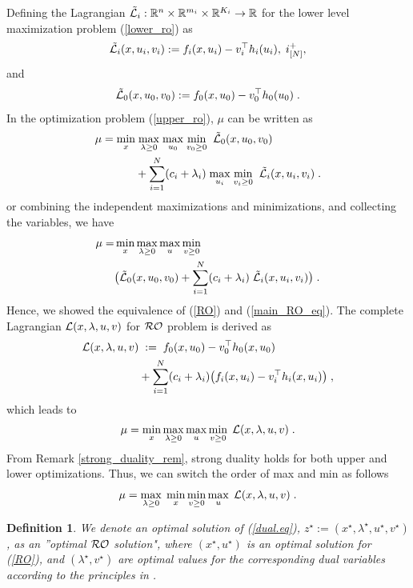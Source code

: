 \documentclass[journal,twoside,web]{ieeecolor}
\newtheorem{definition}{Definition}
\begin{document}
Defining the Lagrangian $\tilde {\cal L}_i:\mathbb{R}^n \times \mathbb{R}^{m_i} \times \mathbb{R}^{K_i} \rightarrow \mathbb{R}$ for the lower level maximization problem (\ref{lower_ro}) as
\begin{align} \label{lower_lag}
\tilde {\cal L}_i(x,u_i,v_i):=f_i(x,u_i)-v_i^\top h_{i}(u_i),\;i^+_{[N]},
\end{align}
and
\begin{align} \label{upper_lag}
\tilde {\cal L}_0(x,u_0,v_0):=f_0(x,u_0)-v_0^\top h_{0}(u_0)\;.
\end{align}
In the optimization problem (\ref{upper_ro}), $\mu$ can be written as
\begin{align} \label{main_RO_eq}
\mu=\underset{x}{\min}&\;\underset{\lambda\geq 0}{\max}\;\underset{u_0}{\max}\;\underset{v_0\geq 0}{\min}\;\; \tilde{\cal L}_0(x,u_0,v_0)\\
&+\sum_{i=1}^N (c_i+\lambda_i)\; \underset{u_i}{\max}\;\underset{v_{i}\geq 0}{\min}\;\;\tilde {\cal L}_i(x,u_i,v_i)\;\nonumber.
\end{align}
or combining the independent maximizations and minimizations, and collecting the variables, we have 
\begin{align}\label{main_RO2_eq}
\mu=&\min_{x}\max_{\lambda\geq 0}\max_{u}\min_{v\geq 0} \\
&\big(\tilde{\cal L}_0(x,u_0,v_0)+\sum_{i=1}^N (c_i+\lambda_i) \; \tilde {\cal L}_i(x,u_i,v_i)\big)\;.\nonumber
\end{align}
Hence, we showed the equivalence of (\ref{RO}) and (\ref{main_RO_eq}). 
The complete Lagrangian ${\cal L}(x,\lambda,u,v)$ for ${\cal RO}$ problem is derived as
\begin{align}
{\cal L}(x,\lambda,u,v)&\;:=\;f_0(x,u_0)-v_0^\top h_0(x,u_0)\nonumber\\
&+\sum_{i=1}^N (c_i+\lambda_i)\big(f_i(x,u_i)-v_i^\top h_i(x,u_i)\big)\;,
\label{lag}
\end{align}
which leads to
\begin{align*}
\mu=\min_{x}\max_{\lambda\geq 0}\max_{u}\min_{v\geq 0}\;{\cal L}(x,\lambda,u,v)\;.
\end{align*}
From Remark \ref{strong_duality_rem}, strong duality holds for both upper and lower optimizations. Thus, we can switch the order of max and min as follows 
\begin{equation}\label{dual.eq}
\mu=\max_{\lambda\geq 0}\;\min_{x}\min_{v\geq 0} \max_{u}\;{\cal L}(x,\lambda,u,v)\;.
\end{equation}

\begin{definition} \label{optimal_ro}
We denote an optimal solution of (\ref{dual.eq}), $z^\star:=(x^\star,\lambda^\star,u^\star,v^\star)$, as an ''optimal ${\cal RO}$ solution", where $(x^\star, u^\star)$ is an optimal solution for (\ref{RO}), and $(\lambda^\star, v^\star)$ are optimal values for the corresponding dual variables according to the principles in \cite[Section~5.9.1]{boyd2004}.
\end{definition}
\end{document}
